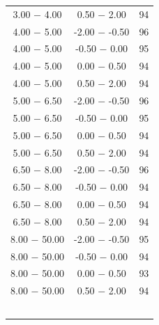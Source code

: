 \documentclass[letterpaper, abstract = on,listof=totoc, bibliography=totoc]{scrreprt}
\begin{document}
\begin{table}[!h]
\begin{minipage}[t]{.33\linewidth}
\begin{tabular}[t]{ccc}
3.00 $-$ 4.00 & 0.50 $-$ 2.00 & 94\\
4.00 $-$ 5.00 & -2.00 $-$ -0.50 & 96\\
4.00 $-$ 5.00 & -0.50 $-$ 0.00 & 95\\
4.00 $-$ 5.00 & 0.00 $-$ 0.50 & 94\\
4.00 $-$ 5.00 & 0.50 $-$ 2.00 & 94\\
5.00 $-$ 6.50 & -2.00 $-$ -0.50 & 96\\
5.00 $-$ 6.50 & -0.50 $-$ 0.00 & 95\\
5.00 $-$ 6.50 & 0.00 $-$ 0.50 & 94\\
5.00 $-$ 6.50 & 0.50 $-$ 2.00 & 94\\
6.50 $-$ 8.00 & -2.00 $-$ -0.50 & 96\\
6.50 $-$ 8.00 & -0.50 $-$ 0.00 & 94\\
6.50 $-$ 8.00 & 0.00 $-$ 0.50 & 94\\
6.50 $-$ 8.00 & 0.50 $-$ 2.00 & 94\\
8.00 $-$ 50.00 & -2.00 $-$ -0.50 & 95\\
8.00 $-$ 50.00 & -0.50 $-$ 0.00 & 94\\
8.00 $-$ 50.00 & 0.00 $-$ 0.50 & 93\\
8.00 $-$ 50.00 & 0.50 $-$ 2.00 & 94\\
\\
\\
\\
\\
\\		
		\hline
		\end{tabular}
	\end{minipage}
\end{table}
\end{document}
